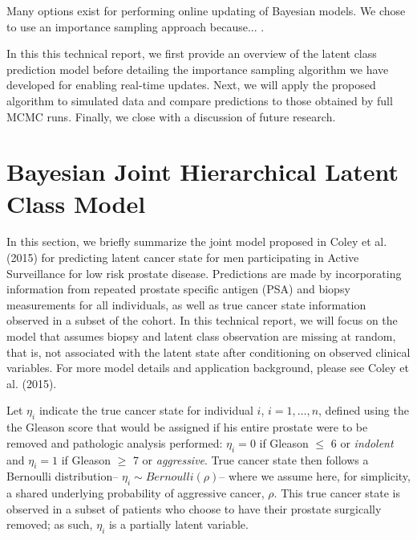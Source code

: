 \documentclass[letterpaper]{article}
\begin{document}
Many options exist for performing online updating of Bayesian models. We chose to use an importance sampling approach because... \cite{Geweke1989}.

In this this technical report, we first provide an overview of the latent class prediction model before detailing the importance sampling algorithm we have developed for enabling real-time updates. Next, we will apply the proposed algorithm to simulated data and compare predictions to those obtained by full MCMC runs. Finally, we close with a discussion of future research.

\section{Bayesian Joint Hierarchical Latent Class Model}
In this section, we briefly summarize the joint model proposed in Coley et al. (2015) for predicting latent cancer state for men participating in Active Surveillance for low risk prostate disease. Predictions are made by incorporating information from repeated prostate specific antigen (PSA) and biopsy measurements for all individuals, as well as true cancer state information observed in a subset of the cohort. In this technical report, we will focus on the model that assumes biopsy and latent class observation are missing at random, that is, not associated with the latent state after conditioning on observed clinical variables. For more model details and application background, please see Coley et al. (2015). 

Let $\eta_i$ indicate the true cancer state for individual $i$, $i=1,\dots,n$, defined using the the Gleason score \cite{Gleason1977, Gleason1992} that would be assigned if his entire prostate were to be removed and pathologic analysis performed: $\eta_i=0$ if Gleason $\leq$ 6 or \textit{indolent} and $\eta_i=1$ if Gleason $\geq$ 7 or \textit{aggressive}. True cancer state then follows a Bernoulli distribution-- $\eta_i\sim Bernoulli(\rho)$-- where we assume here, for simplicity, a shared underlying probability of aggressive cancer, $\rho$. This true cancer state is observed in a subset of patients who choose to have their prostate surgically removed; as such, $\eta_i$ is a partially latent variable.
\end{document}
